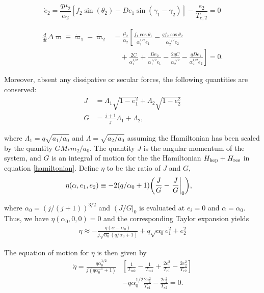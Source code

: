 \documentclass[usenatbib]{mnras}
\DeclarePairedDelimiter{\p}{(}{)}
\begin{document}
\begin{equation}
\label{dote2}
  \dot e_2 = \frac{q\mu_2}{\alpha_2} [f_2\sin(\theta_2) - De_1 \sin(\gamma_1-\gamma_2)]- \frac{e_2}{T_{e,2}}=0
\end{equation}

\begin{align}
\label{dotdpom}
  \frac{d}{dt}\Delta\varpi \equiv \dot\varpi_1-\dot\varpi_2
  &= \frac{\mu_2}{\alpha_2} \left[ \frac{f_1\cos\theta_1}{\alpha_1^{1/2} e_1}
     - \frac{qf_2\cos\theta_2}{\alpha_2^{1/2}e_2}\right.\nonumber \\
  &\quad+ \left.\frac{2C}{\alpha_1^{1/2}} + \frac{De_2}{\alpha_1^{1/2} e_1}
    - \frac{2qC}{\alpha_2^{1/2}} - \frac{qDe_1}{ \alpha_2^{1/2}e_2}\right]=0.
\end{align}

Moreover, absent any dissipative or secular forces, the following quantities are
conserved:
\begin{align}
  J &= \Lambda_1\sqrt{1-e_1^2} + \Lambda_2\sqrt{1-e_2^2}\\
  G &= \frac{j+1}{j} \Lambda_1 + \Lambda_2,
\end{align}

\noindent where \(\Lambda_1 = q\sqrt{a_1/a_0}\) and
\(\Lambda=\sqrt{a_2/a_0}\) assuming the Hamiltonian has been scaled by
the quantity \(GM_*m_2/a_0\).  The quantity \(J\) is the angular momentum
of the system, and \(G\) is an integral of motion for the the
Hamiltonian \(H_{\rm kep}+H_{\rm res}\) in equation \eqref{hamiltonian}.
Define \(\eta\) to be the ratio of \(J\) and \(G\),
\begin{align}
  \eta(\alpha, e_1, e_2) &\equiv - 2(q/\alpha_0+1)\p*{\frac{J}{G}-\left.\frac{J}{G}\right|_{0}},
\end{align}

\noindent
where \(\alpha_0 = (j/(j+1))^{3/2}\) and \(\left(J/G\right|_{0}\) is
evaluated at \(e_i=0\) and \(\alpha=\alpha_0\).
Thus, we have \(\eta(\alpha_0, 0, 0)=0\) and the corresponding Taylor expansion yields
\begin{align}
  \eta \approx -\frac{q(\alpha-\alpha_0)}{j\sqrt{\alpha_0}(q/\alpha_0+1)} + q\sqrt{\alpha_0}e_1^2 + e_2^2
\end{align}

\noindent
The equation of motion for \(\eta\) is then given by
\begin{align}
\label{doteta}
  \dot\eta = \frac{q\alpha_0^{1/2}}{j(q\alpha_0^{-1}+1)}&\left[ \frac{1}{T_{m2}} - \frac{1}{T_{m1}}
      + \frac{2e_1^2}{T_{e1}}- \frac{2e_2^2}{T_{e2}} \right] \nonumber\\
    &- q\alpha_0^{1/2}\frac{2e_1^2}{T_{e1}} - \frac{2e_2^2}{T_{e2}}=0.
\end{align}
\end{document}
